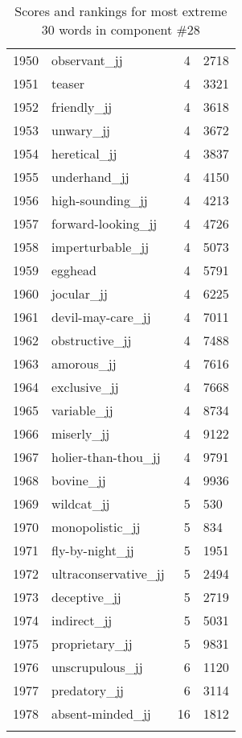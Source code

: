 \begin{longtable}[!htbp]{| rlr@{.}l |}
    1950 & observant\_jj & 4 & 2718 \\
    1951 & teaser & 4 & 3321 \\
    1952 & friendly\_jj & 4 & 3618 \\
    1953 & unwary\_jj & 4 & 3672 \\
    1954 & heretical\_jj & 4 & 3837 \\
    1955 & underhand\_jj & 4 & 4150 \\
    1956 & high-sounding\_jj & 4 & 4213 \\
    1957 & forward-looking\_jj & 4 & 4726 \\
    1958 & imperturbable\_jj & 4 & 5073 \\
    1959 & egghead & 4 & 5791 \\
    1960 & jocular\_jj & 4 & 6225 \\
    1961 & devil-may-care\_jj & 4 & 7011 \\
    1962 & obstructive\_jj & 4 & 7488 \\
    1963 & amorous\_jj & 4 & 7616 \\
    1964 & exclusive\_jj & 4 & 7668 \\
    1965 & variable\_jj & 4 & 8734 \\
    1966 & miserly\_jj & 4 & 9122 \\
    1967 & holier-than-thou\_jj & 4 & 9791 \\
    1968 & bovine\_jj & 4 & 9936 \\
    1969 & wildcat\_jj & 5 & 530 \\
    1970 & monopolistic\_jj & 5 & 834 \\
    1971 & fly-by-night\_jj & 5 & 1951 \\
    1972 & ultraconservative\_jj & 5 & 2494 \\
    1973 & deceptive\_jj & 5 & 2719 \\
    1974 & indirect\_jj & 5 & 5031 \\
    1975 & proprietary\_jj & 5 & 9831 \\
    1976 & unscrupulous\_jj & 6 & 1120 \\
    1977 & predatory\_jj & 6 & 3114 \\
    1978 & absent-minded\_jj & 16 & 1812 \\
    \hline
    \caption{Scores and rankings for most extreme 30 words in component \#28} \\
\end{longtable}

